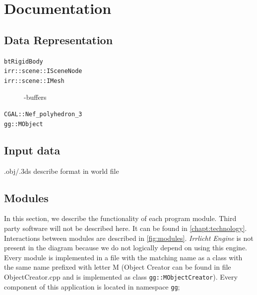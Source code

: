 \chapter{Documentation}

\section{Data Representation}
\begin{description}
\item [{\tt btRigidBody}]
\item [{\tt irr::scene::ISceneNode}]
\item [{\tt irr::scene::IMesh}] -buffers
\item [{\tt CGAL::Nef\_polyhedron\_3}]
\item [{\tt gg::MObject}]
\end{description}


\section{Input data}
\label{sec:data}
.obj/.3ds
describe format in world file

\section{Modules}
In this section, we describe the functionality of each program module. Third party software will not be described here. It can be found in \cref{chapt:technology}. Interactions between modules are described in \cref{fig:modules}. \emph{Irrlicht Engine} is not present in the diagram because we do not logically depend on using this engine. Every module is implemented in a file with the matching name as a class with the same name prefixed with letter M (Object Creator can be found in file ObjectCreator.cpp and is implemented as class {\tt gg::MObjectCreator}). Every component of this application is located in namespace {\tt gg};

